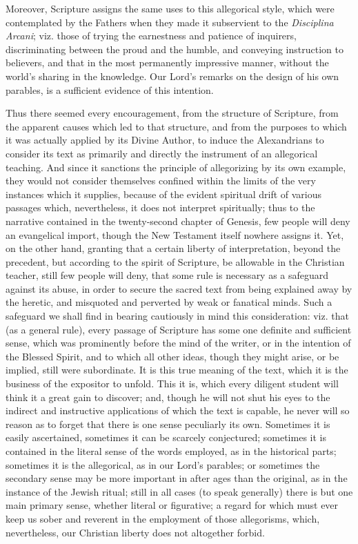Moreover, Scripture assigns the same uses to this allegorical
style, which were contemplated by the Fathers when they made it
subservient to the \emph{Disciplina Arcani}; viz. those of trying the
earnestness and patience of inquirers, discriminating between the
proud and the humble, and conveying instruction to believers, and that
in the most permanently impressive manner, without the world's sharing
in the knowledge. Our Lord's remarks on the design of his own
parables, is a sufficient evidence of this intention.

Thus there seemed every encouragement, from the structure of
Scripture, from the apparent causes which led to that structure, and
from the purposes to which it was actually applied by its Divine
Author, to induce the Alexandrians to consider its text as primarily
and directly the instrument of an allegorical teaching. And since
it sanctions the principle of allegorizing by its own example, they
would not consider themselves confined within the limits of the very
instances which it supplies, because of the evident spiritual drift of
various passages which, nevertheless, it does not interpret
spiritually; thus to the narrative contained in the twenty-second
chapter of Genesis, few people will deny an evangelical import, though
the New Testament itself nowhere assigns it. Yet, on the other hand,
granting that a certain liberty of interpretation, beyond the
precedent, but according to the spirit of Scripture, be allowable in
the Christian teacher, still few people will deny, that some rule is
necessary as a safeguard against its abuse, in order to secure the
sacred text from being explained away by the heretic, and misquoted
and perverted by weak or fanatical minds. Such a safeguard we shall
find in bearing cautiously in mind this consideration: viz. that (as a
general rule), every passage of Scripture has some one definite and
sufficient sense, which was prominently before the mind of the writer,
or in the intention of the Blessed Spirit, and to which all other
ideas, though they might arise, or be implied, still were subordinate.
It is this true meaning of the text, which it is the business of the
expositor to unfold. This it is, which every diligent student will
think it a great gain to discover; and, though he will not shut his
eyes to the indirect and instructive applications of which the text is
capable, he never will so reason as to forget that there is one sense
peculiarly its own. Sometimes it is easily ascertained, sometimes it
can be scarcely conjectured; sometimes it is contained in the literal
sense of the words employed, as in the historical parts;
sometimes it is the allegorical, as in our Lord's parables; or
sometimes the secondary sense may be more important in after ages than
the original, as in the instance of the Jewish ritual; still in all
cases (to speak generally) there is but one main primary sense,
whether literal or figurative; a regard for which must ever keep us
sober and reverent in the employment of those allegorisms, which,
nevertheless, our Christian liberty does not altogether forbid.

